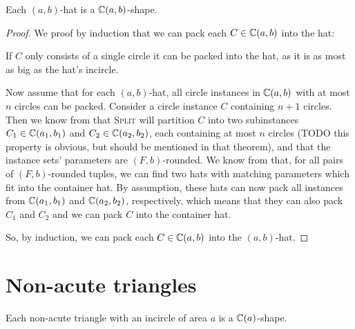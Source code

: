 \begin{theorem}\label{th:hats}
    Each $(a,b)$-hat is a $\mathbb{C}(a,b)$-shape.
\end{theorem}

\begin{proof}

    We proof by induction that we can pack each $C \in \mathbb{C}(a,b)$ into the hat:

    If $C$ only consists of a single circle it can be packed into the hat, as it is as most as big as the hat's incircle.

    Now assume that for each $(a,b)$-hat, all circle instances in $\mathbb{C}(a,b)$ with at most $n$ circles can be packed. Consider a circle instance $C$ containing $n+1$ circles. Then we know from  that \textsc{Split} will partition $C$ into two subinstances $C_1 \in \mathbb{C}(a_1, b_1)$ and $C_2 \in \mathbb{C}(a_2, b_2)$, each containing at most $n$ circles (TODO this property is obvious, but should be mentioned in that theorem), and that the instance sets' parameters are $(F,b)$-rounded. We know from  that, for all pairs of $(F,b)$-rounded tuples, we can find two hats with matching parameters which fit into the container hat. By assumption, these hats can now pack all instances from $\mathbb{C}(a_1, b_1)$ and $\mathbb{C}(a_2, b_2)$, respectively, which means that they can also pack $C_1$ and $C_2$ and we can pack $C$ into the container hat.

    So, by induction, we can pack each $C \in \mathbb{C}(a,b)$ into the $(a,b)$-hat.
\end{proof}

\section{Non-acute triangles}

%

\begin{theorem}
    Each non-acute triangle with an incircle of area $a$ is a $\mathbb{C}(a)$-shape.
\end{theorem}

